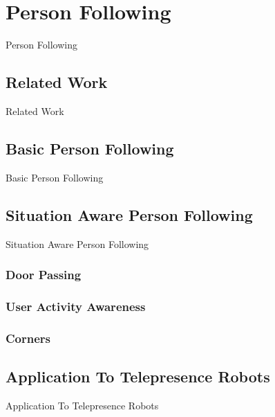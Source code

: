 \chapter{Person Following}
\label{chapter:person_following}

Person Following

\section{Related Work}

Related Work

\section{Basic Person Following}
\label{sec:following_basic_person_following}

Basic Person Following

\section{Situation Aware Person Following}

Situation Aware Person Following

\subsection{Door Passing}

\subsection{User Activity Awareness}

\subsection{Corners}


\section{Application To Telepresence Robots}

Application To Telepresence Robots